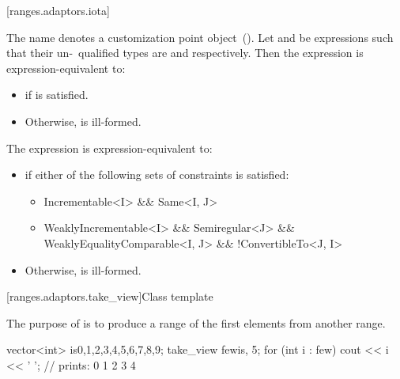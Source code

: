 [ranges.adaptors.iota]{}

\pnum
The name  denotes a customization point object~().
Let  and  be expressions such that their un-\cv\ qualified types
are  and  respectively. Then the expression 
is expression-equivalent to:

\begin{itemize}
\item {} if  is satisfied.
\item Otherwise,  is ill-formed.
\end{itemize}

\pnum
The expression  is expression-equivalent to:

\begin{itemize}
\item {} if either of the following sets of constraints
is satisfied:
\begin{itemize}
\item \begin{codeblock}
Incrementable<I> && Same<I, J>
\end{codeblock}

\item \begin{codeblock}
WeaklyIncrementable<I> && Semiregular<J> &&
WeaklyEqualityComparable<I, J> && !ConvertibleTo<J, I>
\end{codeblock}
\end{itemize}
\item Otherwise,  is ill-formed.
\end{itemize}

[ranges.adaptors.take_view]{Class template }

\pnum
The purpose of  is to produce a range of the first
 elements from another range.

\pnum
\enterexample
\begin{codeblock}
vector<int> is{0,1,2,3,4,5,6,7,8,9};
take_view few{is, 5};
for (int i : few)
  cout << i << ' '; // prints: 0 1 2 3 4
\end{codeblock}
\exitexample

